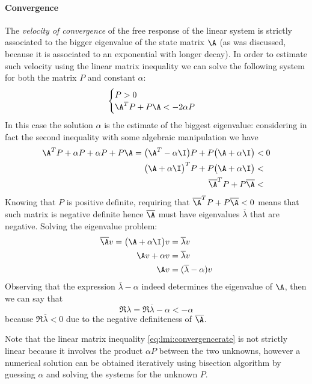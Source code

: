 	\paragraph{Convergence} The \textit{velocity of convergence} of the free response of the linear system is strictly associated to the bigger eigenvalue of the state matrix $\A$ (as was discussed, because it is associated to an exponential with longer decay). In order to estimate such velocity using the linear matrix inequality we can solve the following system for both the matrix $P$ and constant $\alpha$:
	\begin{equation} \label{eq:lmi:convergencerate} \begin{cases}
		P > 0 \\ \A^T P + P \A < -2\alpha P
	\end{cases} \end{equation}
	In this case the solution $\alpha$ is the estimate of the biggest eigenvalue: considering in fact the second inequality with some algebraic manipulation we have
	\begin{align*}
		\A^T P + \alpha P + \alpha P + P \A = \big(\A^T - \alpha \I\big)P + P\big(\A + \alpha \I\big) & < 0 \\ \big(\A + \alpha \I\big)^T P + P \big(\A + \alpha \I\big) & < \\
		\overline \A^T P + P \overline \A & <
	\end{align*}
	Knowing that $P$ is positive definite, requiring that $\overline \A^T P + P \overline \A < 0$ means that such matrix is negative definite hence $\overline \A$ must have eigenvalues $\overline \lambda$ that are negative. Solving the eigenvalue problem:
	\begin{align*}
		\overline \A v = \big(\A + \alpha \I\big) v & = \overline \lambda v \\
		\A v + \alpha v & = \overline \lambda v \\
		\A v & = (\overline \lambda - \alpha) v
	\end{align*}
	Observing that the expression $\overline \lambda - \alpha$ indeed determines the eigenvalue of $\A$, then we can say that
	\[ \Re{\lambda} = \Re{\overline \lambda} - \alpha < - \alpha \]
	because $\Re{\overline \lambda} < 0$ due to the negative definiteness of $\overline \A$. \vspace{3mm}
	
	Note that the linear matrix inequality \ref{eq:lmi:convergencerate} is not strictly linear because it involves the product $\alpha P$ between the two unknowns, however a numerical solution can be obtained iteratively using bisection algorithm by guessing $\alpha$ and solving the systems for the unknown $P$.
	
